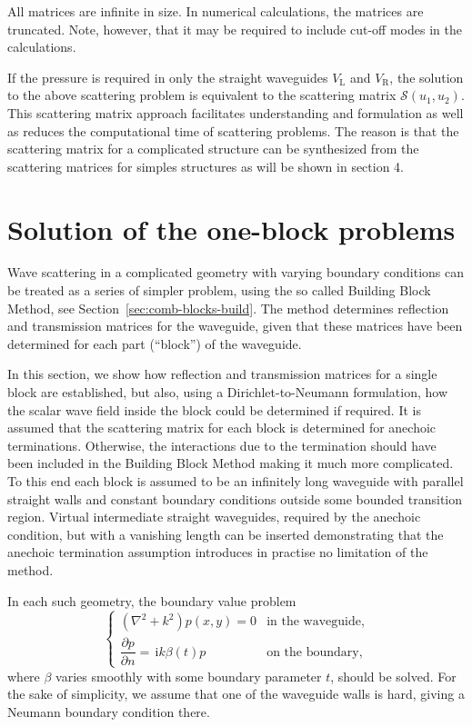 \documentclass[numreferences]{kluwer}
\renewcommand{\i}{\,\mathrm{i}}
\newcommand{\pd}[2]{\dfrac{\partial#1}{\partial#2}}
\begin{document}
All matrices are infinite in size. In numerical calculations, the
matrices are truncated. Note, however, that it may be required to
include cut-off modes in the calculations.

If the pressure is required in only the straight waveguides
$V_{\text{L}}$ and $V_{\text{R}}$, the solution to the above
scattering problem is equivalent to the scattering matrix
$\mathcal{S}(u_1,u_2)$. This scattering matrix approach facilitates
understanding and formulation as well as reduces the computational
time of scattering problems. The reason is that the scattering matrix
for a complicated structure can be synthesized from the scattering
matrices for simples structures as will be shown in section 4.

\section{Solution of the one-block problems}
\label{sec:oneblock}

Wave scattering in a complicated geometry with varying boundary
conditions can be treated as a series of simpler problem, using the so
called Building Block Method, see
Section~\ref{sec:comb-blocks-build}. The method determines reflection
and transmission matrices for the waveguide, given that these
matrices have been determined for each part (``block'') of the
waveguide.

In this section, we show how reflection and transmission matrices for
a single block are established, but also, using a Dirichlet-to-Neumann
formulation, how the scalar wave field inside the block could be
determined if required. It is assumed that the scattering matrix for each block is determined for anechoic terminations. Otherwise, the interactions due to the termination should have been included in the Building Block Method making it much more complicated. To this end each block is
assumed to be an infinitely long waveguide with parallel straight
walls and constant boundary conditions outside some bounded transition
region. Virtual intermediate straight waveguides, required by the anechoic condition, but with a vanishing length can be inserted \cite{nilssonbrander1981b} demonstrating that the anechoic termination assumption introduces in practise no limitation of the method.

In each such geometry, the boundary value problem
\begin{equation}
  \label{eq:bvp1}
  \begin{cases}
    \left(\nabla^2+k^2\right)p(x,y)=0&\text{in the waveguide,}\\[1ex]
    \pd pn=\i k\beta(t)p&\text{on the boundary,}
  \end{cases}
\end{equation}
where $\beta$ varies smoothly with some boundary parameter $t$, should
be solved. For the sake of simplicity, we assume that one of the
waveguide walls is hard, giving a Neumann boundary condition there.
\end{document}
